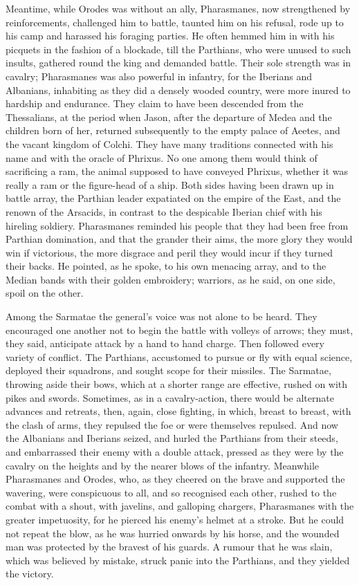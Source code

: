 
Meantime, while Orodes was without an ally, Pharasmanes, now strengthened by reinforcements, challenged him to battle, taunted him on his refusal, rode up to his camp and harassed his foraging parties. He often hemmed him in with his picquets in the fashion of a blockade, till the Parthians, who were unused to such insults, gathered round the king and demanded battle. Their sole strength was in cavalry; Pharasmanes was also powerful in infantry, for the Iberians and Albanians, inhabiting as they did a densely wooded country, were more inured to hardship and endurance. They claim to have been descended from the Thessalians, at the period when Jason, after the departure of Medea and the children born of her, returned subsequently to the empty palace of Aeetes, and the vacant kingdom of Colchi. They have many traditions connected with his name and with the oracle of Phrixus. No one among them would think of sacrificing a ram, the animal supposed to have conveyed Phrixus, whether it was really a ram or the figure-head of a ship. Both sides having been drawn up in battle array, the Parthian leader expatiated on the empire of the East, and the renown of the Arsacids, in contrast to the despicable Iberian chief with his hireling soldiery. Pharasmanes reminded his people that they had been free from Parthian domination, and that the grander their aims, the more glory they would win if victorious, the more disgrace and peril they would incur if they turned their backs. He pointed, as he spoke, to his own menacing array, and to the Median bands with their golden embroidery; warriors, as he said, on one side, spoil on the other.


Among the Sarmatae the general's voice was not alone to be heard. They encouraged one another not to begin the battle with volleys of arrows; they must, they said, anticipate attack by a hand to hand charge. Then followed every variety of conflict. The Parthians, accustomed to pursue or fly with equal science, deployed their squadrons, and sought scope for their missiles. The Sarmatae, throwing aside their bows, which at a shorter range are effective, rushed on with pikes and swords. Sometimes, as in a cavalry-action, there would be alternate advances and retreats, then, again, close fighting, in which, breast to breast, with the clash of arms, they repulsed the foe or were themselves repulsed. And now the Albanians and Iberians seized, and hurled the Parthians from their steeds, and embarrassed their enemy with a double attack, pressed as they were by the cavalry on the heights and by the nearer blows of the infantry. Meanwhile Pharasmanes and Orodes, who, as they cheered on the brave and supported the wavering, were conspicuous to all, and so recognised each other, rushed to the combat with a shout, with javelins, and galloping chargers, Pharasmanes with the greater impetuosity, for he pierced his enemy's helmet at a stroke. But he could not repeat the blow, as he was hurried onwards by his horse, and the wounded man was protected by the bravest of his guards. A rumour that he was slain, which was believed by mistake, struck panic into the Parthians, and they yielded the victory.


